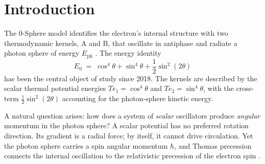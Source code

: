 \documentclass[%
 reprint, amsmath,amssymb, aps, prb, ]{revtex4-2}
\numberwithin{equation}{section}
\newcommand{\iphase}{\theta}
\begin{document}
\begin{abstract}
The electron/positron distinction was first reinterpreted geometrically in the 0-Sphere framework in \cite{hanamura07}; the present paper promotes that reinterpretation to a Lorentz-invariant theorem.
The Zitterbewegung speed $v_\mathrm{ZB} \approx 0.04c$ was derived in \cite{hanamura10}; the present paper shows how it controls the helicity structure.
Thomas precession is identified as the \emph{relativistic geometric correction} that makes the phase-space rotation physically observable, connecting the scalar kernel dynamics to the relativistic precession mechanism established in \cite{hanamura19, hanamura26}.
Paper~\#47~\cite{hanamura47} identified three independent occurrences of $\tfrac{1}{2}$ in the 0-Sphere framework and predicted that their common geometric origin would be examined in a future paper; Section~\ref{subsec:three_halves} of the present work provides that answer.
\end{abstract}

\maketitle

\section{Introduction}

The 0-Sphere model identifies the electron's internal structure with two thermodynamic kernels, A and B, that oscillate in antiphase and radiate a photon sphere of energy $E_{\text{ph}}$ \cite{hanamura01, hanamura06}.
The energy identity
\begin{equation}
E_0 \;=\; \cos^4\iphase + \sin^4\iphase + \frac{1}{2}\sin^2(2\iphase)
\label{eq:energy_identity}
\end{equation}
has been the central object of study since 2018.
The kernels are described by the scalar thermal potential energies $Te_1 = \cos^4\iphase$ and $Te_2 = \sin^4\iphase$, with the cross-term $\tfrac{1}{2}\sin^2(2\iphase)$ accounting for the photon-sphere kinetic energy.

A natural question arises: how does a system of \emph{scalar} oscillators produce \emph{angular} momentum in the photon sphere?
A scalar potential has no preferred rotation direction.
Its gradient is a radial force; by itself, it cannot drive circulation.
Yet the photon sphere carries a spin angular momentum $\hbar$, and Thomas precession connects the internal oscillation to the relativistic precession of the electron spin \cite{hanamura19, hanamura26}.
\end{document}

